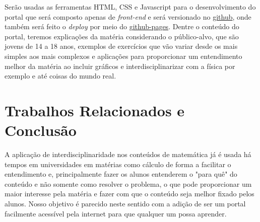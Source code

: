 \documentclass[12pt]{article}
\begin{document}
  Serão usadas as ferramentas HTML, CSS e Javascript para o desenvolvimento do portal que será composto apenas de \textit{front-end} e será versionado no \href{https://github.com/Pedenite/PILC-eq}{github}, onde também será feito o \textit{deploy} por meio do \href{https://pedenite.github.io/PILC-eq/}{github-pages}. Dentre o conteúdo do portal, teremos explicações da matéria considerando o público-alvo, que são jovens de 14 a 18 anos, exemplos de exercícios que vão variar desde os mais simples aos mais complexos e aplicações para proporcionar um entendimento melhor da matéria ao incluir gráficos e interdisciplinarizar com a física por exemplo e até coisas do mundo real.

\section{Trabalhos Relacionados e Conclusão}
  A aplicação de interdisciplinaridade nos conteúdos de matemática já é usada há tempos em universidades em matérias como cálculo de forma a facilitar o entendimento e, principalmente fazer os alunos entenderem o "para quê" do conteúdo e não somente como resolver o problema, o que pode proporcionar um maior interesse pela matéria e fazer com que o conteúdo seja melhor fixado pelos alunos. Nosso objetivo é parecido neste sentido com a adição de ser um portal facilmente acessível pela internet para que qualquer um possa aprender.
\end{document}
